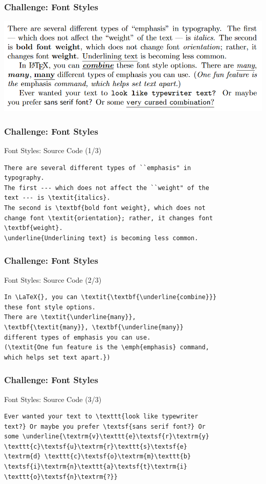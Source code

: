 

\begin{frame}[fragile]
\frametitle{Challenge: Font Styles}
\includegraphics[width=\linewidth]{img/FontEmphs.png}
\end{frame}


\begin{frame}[fragile]
\frametitle{Challenge: Font Styles}
\begin{alertblock}{Font Styles: Source Code (1/3)}
\small
\begin{verbatim}
There are several different types of ``emphasis" in 
typography.
The first --- which does not affect the ``weight" of the
text --- is \textit{italics}.
The second is \textbf{bold font weight}, which does not 
change font \textit{orientation}; rather, it changes font
\textbf{weight}.
\underline{Underlining text} is becoming less common.
\end{verbatim} 
\end{alertblock}
\end{frame}


\begin{frame}[fragile]
\frametitle{Challenge: Font Styles}
\begin{alertblock}{Font Styles: Source Code (2/3)}
\small
\begin{verbatim}
In \LaTeX{}, you can \textit{\textbf{\underline{combine}}}
these font style options. 
There are \textit{\underline{many}}, 
\textbf{\textit{many}}, \textbf{\underline{many}} 
different types of emphasis you can use. 
(\textit{One fun feature is the \emph{emphasis} command, 
which helps set text apart.})
\end{verbatim} 
\end{alertblock}
\end{frame}


\begin{frame}[fragile]
\frametitle{Challenge: Font Styles}
\begin{alertblock}{Font Styles: Source Code (3/3)}
\small
\begin{verbatim}
Ever wanted your text to \texttt{look like typewriter 
text?} Or maybe you prefer \textsf{sans serif font?} Or
some \underline{\textrm{v}\texttt{e}\textsf{r}\textrm{y} 
\texttt{c}\textsf{u}\textrm{r}\texttt{s}\textsf{e}
\textrm{d} \texttt{c}\textsf{o}\textrm{m}\texttt{b}
\textsf{i}\textrm{n}\texttt{a}\textsf{t}\textrm{i}
\texttt{o}\textsf{n}\textrm{?}}
\end{verbatim}
\end{alertblock}
\end{frame}


